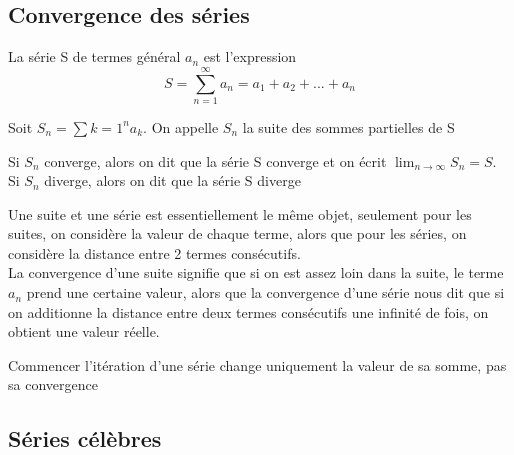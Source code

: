 \documentclass{article}
\begin{document}
\subsection{Convergence des séries}

\begin{definition}
    La série S de termes général $a_n$ est l'expression
    $$ S = \sum_{n=1}^{\infty} a_n = a_1 + a_2 + ... + a_n$$
\end{definition}

\begin{definition}
    Soit $S_n = \sum{k=1}^{n} a_k$. On appelle $S_n$ la suite des sommes
    partielles de S
\end{definition}

\begin{definition}
    Si $S_n$ converge, alors on dit que la série S converge et on écrit
    $ \lim_{n \to \infty} S_n = S$. Si $S_n$ diverge, alors on dit que
    la série S diverge
\end{definition}

\begin{intuition}
    Une suite et une série est essentiellement le même objet, seulement
    pour les suites, on considère la valeur de chaque terme, alors que
    pour les séries, on considère la distance entre 2 termes consécutifs.\\
    La convergence d'une suite signifie que si on est assez loin dans
    la suite, le terme $a_n$ prend une certaine valeur, alors que la
    convergence d'une série nous dit que si on additionne la distance
    entre deux termes consécutifs une infinité de fois, on obtient une
    valeur réelle.
\end{intuition}

\begin{remark}
    Commencer l'itération d'une série change uniquement la valeur de
    sa somme, pas sa convergence
\end{remark}

\begin{theorem}

\end{theorem}

\begin{theorem}

\end{theorem}



\subsection{Séries célèbres}
\end{document}
